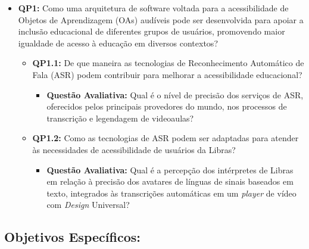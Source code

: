 \begin{itemize}
    \item \textbf{QP1:} Como uma arquitetura de software voltada para a acessibilidade de Objetos de Aprendizagem (OAs) audíveis pode ser desenvolvida para apoiar a inclusão educacional de diferentes grupos de usuários, promovendo maior igualdade de acesso à educação em diversos contextos?
    
    \begin{itemize}
        \item \textbf{QP1.1:} De que maneira as tecnologias de Reconhecimento Automático de Fala (ASR) podem contribuir para melhorar a acessibilidade educacional?
        
        \begin{itemize}
            \item \textbf{Questão Avaliativa:} Qual é o nível de precisão dos serviços de ASR, oferecidos pelos principais provedores do mundo, nos processos de transcrição e legendagem de videoaulas?
        \end{itemize}
        
        \item \textbf{QP1.2:} Como as tecnologias de ASR podem ser adaptadas para atender às necessidades de acessibilidade de usuários da Libras?
        
        \begin{itemize}
            \item \textbf{Questão Avaliativa:} Qual é a percepção dos intérpretes de Libras em relação à precisão dos avatares de línguas de sinais baseados em texto, integrados às transcrições automáticas em um \textit{player} de vídeo com \textit{Design} Universal?
        \end{itemize}
    
    \end{itemize}

\end{itemize}

\subsection*{Objetivos Específicos:}


